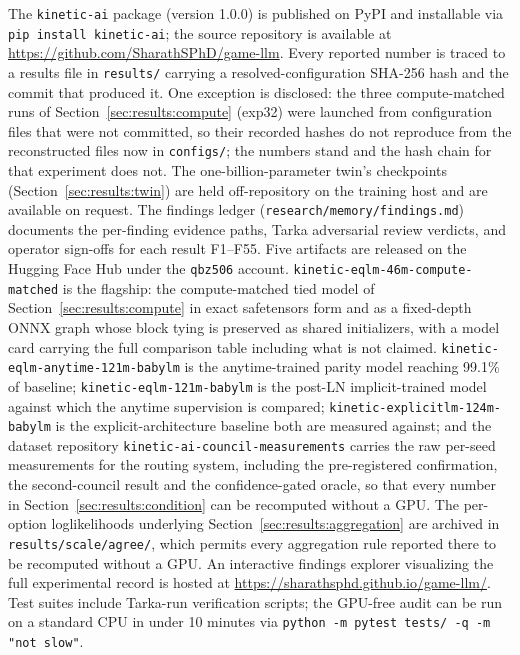 
The \texttt{kinetic-ai} package (version 1.0.0) is published on PyPI and installable via \texttt{pip install kinetic-ai}; the source repository is available at \url{https://github.com/SharathSPhD/game-llm}. Every reported number is traced to a results file in \texttt{results/} carrying a resolved-configuration SHA-256 hash and the commit that produced it. One exception is disclosed: the three compute-matched runs of Section~\ref{sec:results:compute} (exp32) were launched from configuration files that were not committed, so their recorded hashes do not reproduce from the reconstructed files now in \texttt{configs/}; the numbers stand and the hash chain for that experiment does not. The one-billion-parameter twin's checkpoints (Section~\ref{sec:results:twin}) are held off-repository on the training host and are available on request. The findings ledger (\texttt{research/memory/findings.md}) documents the per-finding evidence paths, Tarka adversarial review verdicts, and operator sign-offs for each result F1--F55. Five artifacts are released on the Hugging Face Hub under the \texttt{qbz506} account. \texttt{kinetic-eqlm-46m-compute-matched} is the flagship: the compute-matched tied model of Section~\ref{sec:results:compute} in exact safetensors form and as a fixed-depth ONNX graph whose block tying is preserved as shared initializers, with a model card carrying the full comparison table including what is not claimed. \texttt{kinetic-eqlm-anytime-121m-babylm} is the anytime-trained parity model reaching 99.1\% of baseline; \texttt{kinetic-eqlm-121m-babylm} is the post-LN implicit-trained model against which the anytime supervision is compared; \texttt{kinetic-explicitlm-124m-babylm} is the explicit-architecture baseline both are measured against; and the dataset repository \texttt{kinetic-ai-council-measurements} carries the raw per-seed measurements for the routing system, including the pre-registered confirmation, the second-council result and the confidence-gated oracle, so that every number in Section~\ref{sec:results:condition} can be recomputed without a GPU. The per-option loglikelihoods underlying Section~\ref{sec:results:aggregation} are archived in \texttt{results/scale/agree/}, which permits every aggregation rule reported there to be recomputed without a GPU. An interactive findings explorer visualizing the full experimental record is hosted at \url{https://sharathsphd.github.io/game-llm/}. Test suites include Tarka-run verification scripts; the GPU-free audit can be run on a standard CPU in under 10 minutes via \texttt{python -m pytest tests/ -q -m "not slow"}.
